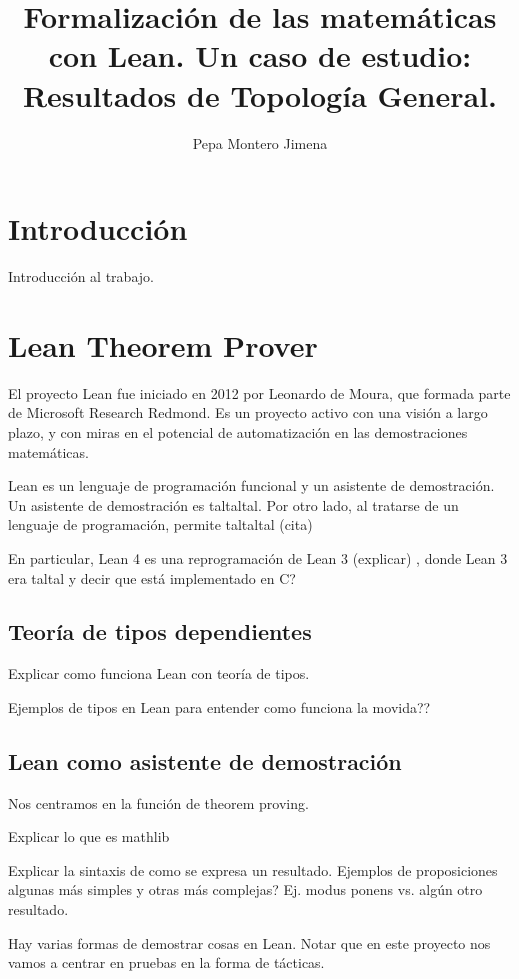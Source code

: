 \documentclass{article}
\title{Formalización de las matemáticas con Lean. Un caso de estudio: Resultados de Topología General.}
\author{Pepa Montero Jimena}
\date{}
\begin{document}
\maketitle

\section{Introducción}

Introducción al trabajo.

\section{Lean Theorem Prover}

El proyecto Lean fue iniciado en 2012 por Leonardo de Moura, que formada parte de Microsoft Research Redmond. Es un proyecto activo con una visión a largo plazo, y con miras en el potencial de automatización en las demostraciones matemáticas.\cite{avigad2015theorem}

Lean es un lenguaje de programación funcional y un asistente de demostración. Un asistente de demostración es taltaltal. \cite{leanprover2024} Por otro lado, al tratarse de un lenguaje de programación, permite taltaltal (cita)

En particular, Lean 4 es una reprogramación de Lean 3 (explicar) \cite{moura2021lean}, donde Lean 3 era taltal y decir que está implementado en C?



\subsection{Teoría de tipos dependientes}

Explicar como funciona Lean con teoría de tipos.

Ejemplos de tipos en Lean para entender como funciona la movida??


\subsection{Lean como asistente de demostración}

Nos centramos en la función de theorem proving.

Explicar lo que es mathlib

Explicar la sintaxis de como se expresa un resultado. Ejemplos de proposiciones algunas más simples y otras más complejas? Ej. modus ponens vs. algún otro resultado.

Hay varias formas de demostrar cosas en Lean. Notar que en este proyecto nos vamos a centrar en pruebas en la forma de tácticas.
\end{document}
